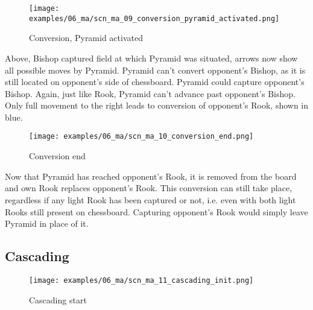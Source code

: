 \clearpage %

\noindent
\begin{figure}[!h]
\texttt{[image: examples/06\_ma/scn\_ma\_09\_conversion\_pyramid\_activated.png]}
\caption{Conversion, Pyramid activated}
\label{fig:scn_ma_09_conversion_pyramid_activated}
\end{figure}

Above, Bishop captured field at which Pyramid was situated, arrows now show all
possible moves by Pyramid. Pyramid can't convert opponent's Bishop, as it is still
located on opponent's side of chessboard. Pyramid could capture opponent's Bishop.
Again, just like Rook, Pyramid can't advance past opponent's Bishop. Only full
movement to the right leads to conversion of opponent's Rook, shown in blue.

\clearpage %

\noindent
\begin{figure}[!h]
\texttt{[image: examples/06\_ma/scn\_ma\_10\_conversion\_end.png]}
\caption{Conversion end}
\label{fig:scn_ma_10_conversion_end}
\end{figure}

Now that Pyramid has reached opponent's Rook, it is removed from the board and
own Rook replaces opponent's Rook. This conversion can still take place, regardless
if any light Rook has been captured or not, i.e. even with both light Rooks still
present on chessboard. Capturing opponent's Rook would simply leave Pyramid in
place of it.

\clearpage %

\subsection*{Cascading}

\noindent
\begin{figure}[!h]
\texttt{[image: examples/06\_ma/scn\_ma\_11\_cascading\_init.png]}
\caption{Cascading start}
\label{fig:scn_ma_11_cascading_init}
\end{figure}


